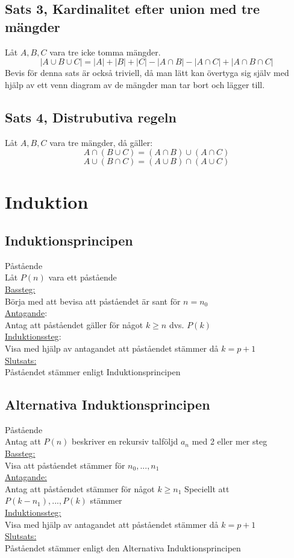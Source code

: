 \documentclass{article}
\begin{document}
	\subsection{Sats 3, Kardinalitet efter union med tre mängder}
	Låt $A, B, C$ vara tre icke tomma mängder.
	$$ |A \cup B \cup C| = |A| + |B| + |C| - |A \cap B| - |A \cap C| + |A \cap B \cap C| $$
	Bevis för denna sats är också triviell, då man lätt kan övertyga sig själv med hjälp av ett venn diagram av de mängder man tar bort och lägger till. 

	\subsection{Sats 4, Distrubutiva regeln}
	Låt $A, B, C$ vara tre mängder, då gäller: 
	$$ A \cap (B \cup C) = (A \cap B) \cup (A \cap C) $$
	$$ A \cup (B \cap C) = (A \cup B) \cap (A \cup C) $$
	\newpage
		
	\section{Induktion}
	\subsection{Induktionsprincipen}
	Påstående \\ 
	Låt $P(n)$ vara ett påstående \\
	\underline{Bassteg:} \\
	Börja med att bevisa att påståendet är sant för $n = n_{0}$ \\
	\underline{Antagande}: \\
	Antag att påståendet gäller för något $k \geq n$ dvs. $P(k)$ \\
	\underline{Induktionssteg}: \\
	Visa med hjälp av antagandet att påståendet stämmer då $k = p + 1$ \\
	\underline{Slutsats:} \\
	Påståendet stämmer enligt Induktionsprincipen \\
	\subsection{Alternativa Induktionsprincipen}
	Påstående \\
	Antag att $P(n)$ beskriver en rekursiv talföljd $a_{n}$ med 2 eller mer steg \\
	\underline{Bassteg:} \\
	Visa att påståendet stämmer för $n_{0}, ... , n_{1}$ \\
	\underline{Antagande:} \\
	Antag att påståendet stämmer för något $k \geq n_{1}$ Speciellt att $P(k-n_{1}), ... , P(k)$ stämmer \\
	\underline{Induktionssteg:} \\
	Visa med hjälp av antagandet att påståendet stämmer då $k = p + 1$ \\
	\underline{Slutsats:} \\
	Påståendet stämmer enligt den Alternativa Induktionsprincipen \\
\end{document}
